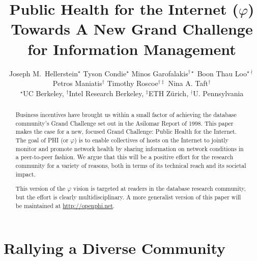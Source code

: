 \documentclass{acm_proc_article-sp}
\def\dblspace{\xspace\xspace}
\def\philogo{{\large $\varphi$}\xspace}
\begin{document}
\title{Public Health for the Internet ({\Huge $\varphi$})\\
{\Large\bf Towards A New Grand Challenge for Information Management}}

\author{
Joseph M.\ Hellerstein$^\star$ \dblspace Tyson Condie$^\star$ \dblspace Minos Garofalakis$^{\dagger\star}$ \dblspace Boon Thau Loo$^{\star\nmid}$\\
Petros Maniatis$^\dagger$ \dblspace Timothy Roscoe$^{\dagger\ddagger}$ \dblspace Nina A. Taft$^\dagger$\\
{\rm\large $^\star$UC Berkeley, $^\dagger$Intel Research Berkeley, $^\ddagger$ETH Z\"{u}rich, $^{\nmid}$U. Pennsylvania}
}

\date{}

\maketitle
\begin{abstract}
	Business incentives have brought us within a small factor of achieving the database community's Grand Challenge set out in the Asilomar Report of 1998. This paper makes the case for a new, focused Grand Challenge: Public Health for the Internet. The goal of PHI (or \philogo) is to enable collectives of hosts on the Internet to jointly monitor and promote network health by sharing information on network conditions in a peer-to-peer fashion. We argue that this will be a positive effort for the research community for a variety of reasons, both in terms of its technical reach and its societal impact.
	
	This version of the \philogo vision is targeted at readers in the database research community, but the effort is clearly multidisciplinary. A more generalist version of this paper will be maintained at \url{http://openphi.net}. 
\end{abstract}

\section{Rallying a Diverse Community} 
\end{document}
